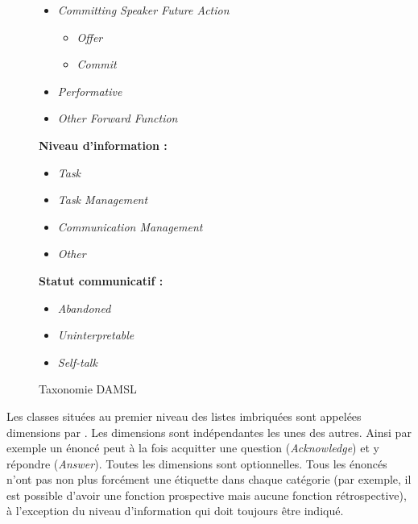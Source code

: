 \documentclass[10pt,a4paper,twoside]{article}
\begin{document}
\begin{figure}[h]
{\begin{itemize}[topsep=0pt,itemsep=-2pt,leftmargin=15pt]
\begin{itemize}
			\begin{itemize}
				\item \textit{Info-Request}
				\item \textit{Action-Directive}
			\end{itemize}
		\end{itemize}
		\item \textit{Committing Speaker Future Action}
		\begin{itemize}
			\item \textit{Offer}
			\item \textit{Commit}
		\end{itemize}
		\item \textit{Performative}
		\item \textit{Other Forward Function}
	\end{itemize}

	}%
	\parbox[t]{2.2in}{\raggedright%
	\textbf{Niveau d'information :}
	\begin{itemize}[topsep=0pt,itemsep=-2pt,leftmargin=15pt]
		\item \textit{Task}
		\item \textit{Task Management}
		\item \textit{Communication Management}
		\item \textit{Other}
	\end{itemize}
	\vspace{0.5cm}
	\textbf{Statut communicatif :}
	\begin{itemize}
		\item \textit{Abandoned}
		\item \textit{Uninterpretable}
		\item \textit{Self-talk}
	\end{itemize}

	}
	\caption{Taxonomie DAMSL}
	\label{fig:DAMSLTaxonomy}
\end{figure}

Les classes situées au premier niveau des listes imbriquées sont appelées \og dimensions \fg{} par \citeauthor{core1997coding}. Les dimensions sont indépendantes les unes des autres. Ainsi par exemple un énoncé peut à la fois acquitter une question (\textit{Acknowledge}) et y répondre (\textit{Answer}). Toutes les dimensions sont optionnelles. Tous les énoncés n'ont pas non plus forcément une étiquette dans chaque catégorie (par exemple, il est possible d'avoir une fonction prospective mais aucune fonction rétrospective), à l'exception du niveau d'information qui doit toujours être indiqué.
\end{document}
